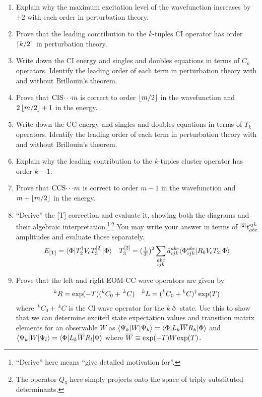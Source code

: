 \documentclass[11pt]{article}
\begin{document}
\begin{enumerate}
\item
Explain why the maximum excitation level of the wavefunction increases by $+2$ with each order in perturbation theory.

\item
Prove that the leading contribution to the $k$-tuples CI operator has order $\left\lceil k/2\right\rceil$ in perturbation theory.

\item
Write down the CI energy and singles and doubles equations in terms of $C_k$ operators.  Identify the leading order of each term in perturbation theory with and without Brillouin's theorem.

\item
Prove that $\mathrm{CIS}{\cdots}m$ is correct to order $\left\lfloor m/2\right\rfloor$ in the wavefunction and $2\left\lfloor m/2\right\rfloor + 1$ in the energy.

\item
Write down the CC energy and singles and doubles equations in terms of $T_k$ operators.  Identify the leading order of each term in perturbation theory with and without Brillouin's theorem.

\item
Explain why the leading contribution to the $k$-tuples cluster operator has order $k-1$.

\item
Prove that $\mathrm{CCS}{\cdots}m$ is correct to order $m-1$ in the wavefunction and $m + \left\lfloor m/2\right\rfloor$ in the energy.

\item
``Derive'' the [T] correction and evaluate it, showing both the diagrams and their algebraic interpretation.\footnote{``Derive'' here means ``give detailed motivation for''.}\,\footnote{The operator $Q_3$ here simply projects onto the space of triply substituted determinants.}
You may write your answer in terms of ${}^{[2]}t_{abc}^{ijk}$ amplitudes and evaluate those separately.
\begin{align}
  E_{[\mathrm{T}]}
=
  \langle\Phi |T_2^\dagger V_{\mathrm{c}} T_3^{[2]}|\Phi \rangle
&&
  T_3^{[2]}
=
  (\tfrac{1}{3!})^2
  \sum_{\substack{abc\\ijk}}
  \tilde{a}_{ijk}^{abc}
  \langle\Phi _{ijk}^{abc}|
    R_0
    V_{\mathrm{c}}
    T_2
  |\Phi \rangle
\end{align}

\item
Prove that the left and right EOM-CC wave operators are given by
\begin{align}
  {}^kR
=
  \mathrm{exp}(-T)
  (
    {}^kC_0
  +
    \,{}^kC
  )
&&
  {}^kL
=
  (
    {}^kC_0
  +
    {}^kC
  )^\dagger\,
  \mathrm{exp}(T)
\end{align}
where $\,{}^kC_0+\,{}^kC$ is the CI wave operator for the $k\eth$ state.
Use this to show that we can determine excited state expectation values and transition matrix elements for an observable $W$ as
$
  \langle\Psi _k|W|\Psi _k\rangle
=
  \langle\Phi |L_k\overline{W}R_k|\Phi \rangle
$
and
$
  \langle\Psi _k|W|\Psi _l\rangle
=
  \langle\Phi |L_k\overline{W}R_l|\Phi \rangle
$
where
$
  \overline{W}
\equiv
  \mathrm{exp}(-T)
  W
  \mathrm{exp}(T)
$.


\end{enumerate}
\end{document}
